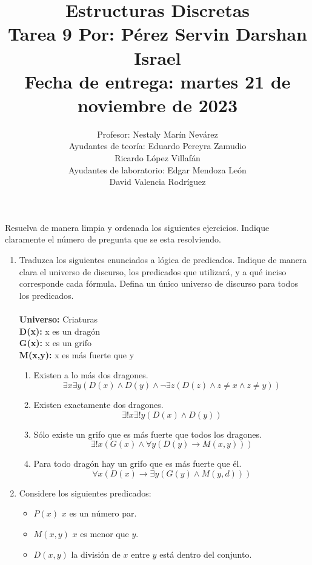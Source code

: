 \documentclass[a4paper,10pt]{article}
\title{Estructuras Discretas\\Tarea 9 \textbf{Por: P\'erez Servin Darshan Israel}\\ Fecha de entrega: martes 21 de noviembre de 2023}
\author{Profesor: Nestaly Mar\'in Nev\'arez \\ Ayudantes de teor\'ia: Eduardo Pereyra Zamudio  \\ \phantom{Ayudantes de teor\'ia:} Ricardo L\'opez Villaf\'an \phantom{aa}\\ Ayudantes de laboratorio: Edgar Mendoza Le\'on \phantom{aaai}\\ \phantom{Ayudantes de laboratorio:} David Valencia Rodr\'iguez}
\date{}
\begin{document}
\maketitle

\vspace{-15pt}
Resuelva de manera limpia y ordenada los siguientes ejercicios. 
Indique claramente el n\'umero de pregunta que se esta resolviendo.


\begin{enumerate}

	\item {} Traduzca los siguientes enunciados a l\'ogica de predicados. 
  Indique de manera clara el universo de discurso, los predicados que utilizar\'a, y a qu\'e inciso corresponde cada f\'ormula. Defina un \'unico universo de discurso para todos los predicados.\\
    \\ \textbf{Universo:} Criaturas
    \\ \textbf{D(x):} x es un drag\'on
    \\ \textbf{G(x):} x es un grifo
    \\ \textbf{M(x,y):} x es m\'as fuerte que y
  \begin{enumerate}    
    \item Existen a lo m\'as dos dragones.
    $$\exists x \exists y (D(x) \wedge D(y) \wedge \neg \exists z (D(z) \wedge z \neq x \wedge z \neq y))$$
    \item Existen exactamente dos dragones.
    $$\exists ! x \exists ! y (D(x) \wedge D(y))$$
    \item S\'olo existe un grifo que es m\'as fuerte que todos los dragones.
    $$\exists ! x (G(x) \wedge \forall y(D(y) \to M(x,y)))$$
    \item Para todo drag\'on hay un grifo que es m\'as fuerte que \'el.
    $$\forall x(D(x) \to \exists y ( G(y) \wedge M(y, d)))$$
  \end{enumerate}
  
 \item {} Considere los siguientes predicados:
  \begin{itemize}
    \item $P(x)$ $x$ es un n\'umero par.
    \item $M(x,y)$ $x$ es menor que $y$.
    \item $D(x,y)$ la divisi\'on de $x$ entre $y$ est\'a dentro del conjunto.
  \end{itemize}


\end{enumerate}
\end{document}
